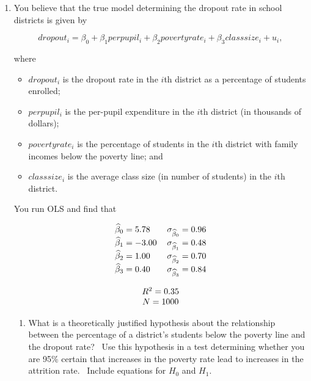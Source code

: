 \documentclass[11pt]{article}
\begin{document}
\begin{enumerate}
\item You believe that the true model determining the dropout rate in school
districts is given by

\begin{equation*}
dropout_{i}=\beta _{0}+\beta _{1}perpupil_{i}+\beta
_{2}povertyrate_{i}+\beta _{3}classsize_{i}+u_{i},
\end{equation*}

\qquad where

\begin{itemize}
\item $dropout_{i}$ is the dropout rate in the $i$th district as a
percentage of students enrolled;

\item $perpupil_{i}$ is the per-pupil expenditure in the $i$th district (in
thousands of dollars);

\item $povertyrate_{i}$ is the percentage of students in the $i$th district
with family incomes below the poverty line; and

\item $classsize_{i}$ is the average class size (in number of students) in
the $i$th district.
\end{itemize}

You run OLS and find that

\begin{equation*}
\begin{tabular}{ll}
$\widehat{\beta }_{0}=5.78$ & $\sigma _{\widehat{\beta }_{0}}=0.96$ \\ 
$\widehat{\beta }_{1}=-3.00$ & $\sigma _{\widehat{\beta }_{1}}=0.48$ \\ 
$\widehat{\beta }_{2}=1.00$ & $\sigma _{\widehat{\beta }_{2}}=0.70$ \\ 
$\widehat{\beta }_{3}=0.40$ & $\sigma _{\widehat{\beta }_{3}}=0.84$ \\ 
\multicolumn{1}{c}{} & \multicolumn{1}{c}{} \\ 
\multicolumn{2}{c}{$R^{2}=0.35$} \\ 
\multicolumn{2}{c}{$N=1000$}%
\end{tabular}%
\end{equation*}

\begin{enumerate}
\item What is a theoretically justified hypothesis about the relationship
between the percentage of a district's students below the poverty line and
the dropout rate? \ Use this hypothesis in a test determining whether you
are 95\% certain that increases in the poverty rate lead to increases in the
attrition rate. \ Include equations for $H_{0}$ and $H_{1}$.


\end{enumerate}
\end{enumerate}
\end{document}
